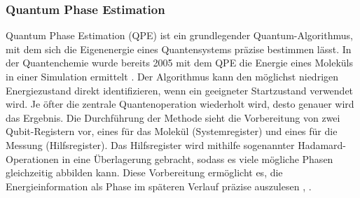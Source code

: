 \subsubsection*{Quantum Phase Estimation}
Quantum Phase Estimation (QPE) ist ein grundlegender Quantum-Algorithmus, mit dem sich die Eigenenergie eines Quantensystems präzise bestimmen lässt. In der Quantenchemie wurde bereits 2005 mit dem QPE die Energie eines Moleküls in einer Simulation ermittelt \citealp[5]{weidmanQuantumComputingChemistry2024a}. Der Algorithmus kann den möglichst niedrigen Energiezustand direkt identifizieren, wenn ein geeigneter Startzustand verwendet wird. Je öfter die zentrale Quantenoperation wiederholt wird, desto genauer wird das Ergebnis.
Die Durchführung der Methode sieht die Vorbereitung von zwei Qubit-Registern vor, eines für das Molekül (Systemregister) und eines für die Messung (Hilfsregister). Das Hilfsregister wird mithilfe sogenannter Hadamard-Operationen in eine Überlagerung gebracht, sodass es viele mögliche Phasen gleichzeitig abbilden kann. Diese Vorbereitung ermöglicht es, die Energieinformation als Phase im späteren Verlauf präzise auszulesen \citealp[25]{weidmanQuantumComputingChemistry2024a}, \citealp[29]{mottaEmergingQuantumComputing2022}. 

